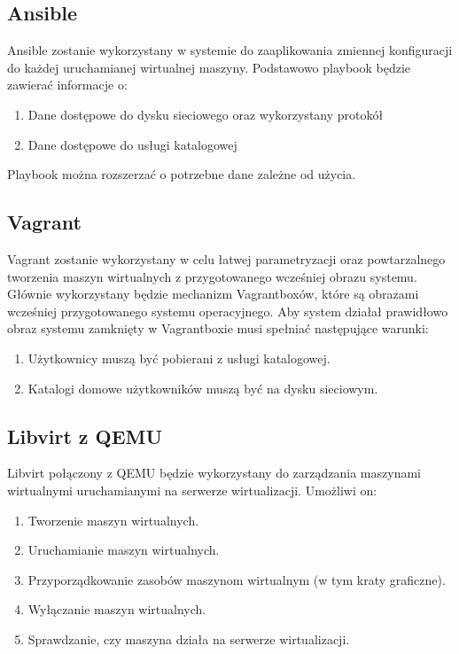\documentclass[../deliverable-two.tex]{subfiles}
\begin{document}
\label{external-tools}

\subsection{Ansible}
Ansible zostanie wykorzystany w systemie do zaaplikowania zmiennej konfiguracji do każdej uruchamianej wirtualnej maszyny.
Podstawowo playbook będzie zawierać informacje o:
\begin{enumerate}
	\item Dane dostępowe do dysku sieciowego oraz wykorzystany protokół
	\item Dane dostępowe do usługi katalogowej
\end{enumerate}
Playbook można rozszerzać o potrzebne dane zależne od użycia.

\subsection{Vagrant}
Vagrant zostanie wykorzystany w celu łatwej parametryzacji oraz powtarzalnego tworzenia maszyn wirtualnych z przygotowanego wcześniej obrazu systemu.
Głównie wykorzystany będzie mechanizm Vagrantboxów, które są obrazami wcześniej przygotowanego systemu operacyjnego.
Aby system działał prawidłowo obraz systemu zamknięty w Vagrantboxie musi spełniać następujące warunki:
\begin{enumerate}
	\item Użytkownicy muszą być pobierani z usługi katalogowej.
	\item Katalogi domowe użytkowników muszą być na dysku sieciowym.
\end{enumerate}

\subsection{Libvirt z QEMU}
Libvirt połączony z QEMU będzie wykorzystany do zarządzania maszynami wirtualnymi uruchamianymi na serwerze wirtualizacji.
Umożliwi on:
\begin{enumerate}
	\item Tworzenie maszyn wirtualnych.
	\item Uruchamianie maszyn wirtualnych.
	\item Przyporządkowanie zasobów maszynom wirtualnym (w tym kraty graficzne).
	\item Wyłączanie maszyn wirtualnych.
	\item Sprawdzanie, czy maszyna działa na serwerze wirtualizacji.
\end{enumerate}
\end{document}
